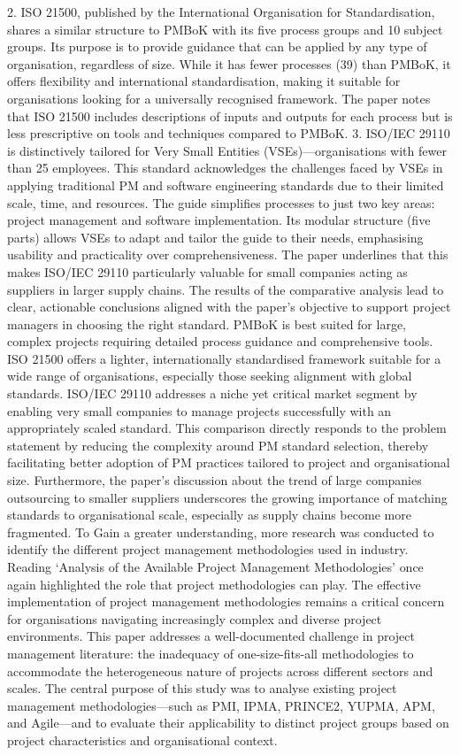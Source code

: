 \documentclass{report}
\begin{document}
    2. ISO 21500, published by the International Organisation for Standardisation, shares a similar structure to PMBoK with its five process groups and 10 subject groups. Its purpose is to provide guidance that can be applied by any type of organisation, regardless of size. While it has fewer processes (39) than PMBoK, it offers flexibility and international standardisation, making it suitable for organisations looking for a universally recognised framework. The paper notes that ISO 21500 includes descriptions of inputs and outputs for each process but is less prescriptive on tools and techniques compared to PMBoK.
    3. ISO/IEC 29110 is distinctively tailored for Very Small Entities (VSEs)—organisations with fewer than 25 employees. This standard acknowledges the challenges faced by VSEs in applying traditional PM and software engineering standards due to their limited scale, time, and resources. The guide simplifies processes to just two key areas: project management and software implementation. Its modular structure (five parts) allows VSEs to adapt and tailor the guide to their needs, emphasising usability and practicality over comprehensiveness. The paper underlines that this makes ISO/IEC 29110 particularly valuable for small companies acting as suppliers in larger supply chains.
The results of the comparative analysis lead to clear, actionable conclusions aligned with the paper’s objective to support project managers in choosing the right standard. PMBoK is best suited for large, complex projects requiring detailed process guidance and comprehensive tools. ISO 21500 offers a lighter, internationally standardised framework suitable for a wide range of organisations, especially those seeking alignment with global standards. ISO/IEC 29110 addresses a niche yet critical market segment by enabling very small companies to manage projects successfully with an appropriately scaled standard.
This comparison directly responds to the problem statement by reducing the complexity around PM standard selection, thereby facilitating better adoption of PM practices tailored to project and organisational size. Furthermore, the paper’s discussion about the trend of large companies outsourcing to smaller suppliers underscores the growing importance of matching standards to organisational scale, especially as supply chains become more fragmented. 
To Gain a greater understanding, more research was conducted to identify the different project management methodologies used in industry. Reading ‘Analysis of the Available Project Management Methodologies’ \parencite{jovanovicAnalysisAvailableProject2018} once again highlighted the role that project methodologies can play. The effective implementation of project management methodologies remains a critical concern for organisations navigating increasingly complex and diverse project environments. This paper addresses a well-documented challenge in project management literature: the inadequacy of one-size-fits-all methodologies to accommodate the heterogeneous nature of projects across different sectors and scales. The central purpose of this study was to analyse existing project management methodologies—such as PMI, IPMA, PRINCE2, YUPMA, APM, and Agile—and to evaluate their applicability to distinct project groups based on project characteristics and organisational context.
\end{document}
